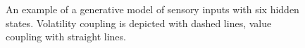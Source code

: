 \begin{figure}
  \centering

  \small

  \newcommand{\w}[1]{\textcolor{white}{#1}}
  \def\svgwidth{0.9\textwidth}


  \caption{An example of a generative model of sensory inputs with six hidden states. Volatility coupling is depicted with dashed lines, value coupling with straight lines.}
  \label{\figlabel}
\end{figure}
